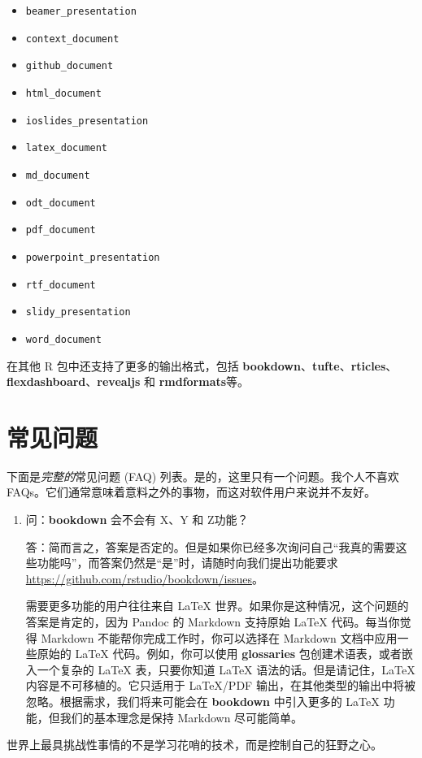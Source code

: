 \documentclass[
  12pt,
]{krantz}
\providecommand{\tightlist}{%
  \setlength{\itemsep}{0pt}\setlength{\parskip}{0pt}}
\theoremstyle{definition}
\theoremstyle{definition}
\theoremstyle{definition}
\theoremstyle{definition}
\theoremstyle{remark}
\begin{document}
\begin{itemize}
\tightlist
\item
  \texttt{beamer\_presentation}
\item
  \texttt{context\_document}
\item
  \texttt{github\_document}
\item
  \texttt{html\_document}
\item
  \texttt{ioslides\_presentation}
\item
  \texttt{latex\_document}
\item
  \texttt{md\_document}
\item
  \texttt{odt\_document}
\item
  \texttt{pdf\_document}
\item
  \texttt{powerpoint\_presentation}
\item
  \texttt{rtf\_document}
\item
  \texttt{slidy\_presentation}
\item
  \texttt{word\_document}
\end{itemize}

在其他 R 包中还支持了更多的输出格式，包括 \textbf{bookdown}、\textbf{tufte}、\textbf{rticles}、\textbf{flexdashboard}、\textbf{revealjs} 和 \textbf{rmdformats}等。

\chapter{常见问题}\label{ux5e38ux89c1ux95eeux9898}

下面是\emph{完整的}常见问题 (FAQ) 列表。是的，这里只有一个问题。我个人不喜欢 FAQs。它们通常意味着意料之外的事物，而这对软件用户来说并不友好。

\begin{enumerate}
\def\labelenumi{\arabic{enumi}.}
\item
  问：\textbf{bookdown} 会不会有 X、Y 和 Z功能？

  答：简而言之，答案是否定的。但是如果你已经多次询问自己``我真的需要这些功能吗''，而答案仍然是``是''时，请随时向我们提出功能要求 \url{https://github.com/rstudio/bookdown/issues}。

  需要更多功能的用户往往来自 LaTeX 世界。如果你是这种情况，这个问题的答案是肯定的，因为 Pandoc 的 Markdown 支持原始 LaTeX 代码。每当你觉得 Markdown 不能帮你完成工作时，你可以选择在 Markdown 文档中应用一些原始的 LaTeX 代码。例如，你可以使用 \textbf{glossaries} 包创建术语表，或者嵌入一个复杂的 LaTeX 表，只要你知道 LaTeX 语法的话。但是请记住，LaTeX 内容是不可移植的。它只适用于 LaTeX/PDF 输出，在其他类型的输出中将被忽略。根据需求，我们将来可能会在 \textbf{bookdown} 中引入更多的 LaTeX 功能，但我们的基本理念是保持 Markdown 尽可能简单。
\end{enumerate}

世界上最具挑战性事情的不是学习花哨的技术，而是控制自己的狂野之心。

\backmatter

  

\printindex
\end{document}
